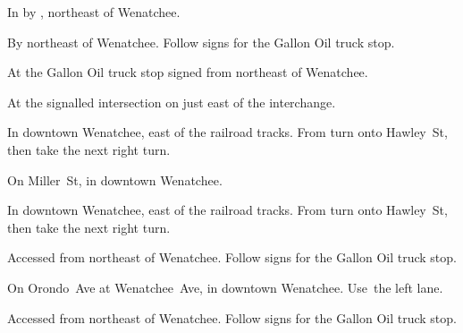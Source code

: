 
\begin{LocationList}

In  by  , northeast of Wenatchee.

By   northeast of Wenatchee.
Follow signs for the Gallon Oil truck stop.

At the Gallon Oil truck stop signed from   northeast of Wenatchee.

\Location{\GarageHQ \Garage}
At the signalled intersection on   just east of the  interchange.

In downtown Wenatchee, east of the railroad tracks.
From  turn onto Hawley~St, then take the next right turn.

\Location{\RecruitmentAgency \Recruitment}
On Miller~St, in downtown Wenatchee.

In downtown Wenatchee, east of the railroad tracks.
From  turn onto Hawley~St, then take the next right turn.

Accessed from   northeast of Wenatchee.
Follow signs for the Gallon Oil truck stop.

On Orondo~Ave at Wenatchee~Ave, in downtown Wenatchee.
Use~the left lane.

Accessed from   northeast of Wenatchee.
Follow signs for the Gallon Oil truck stop.

\end{LocationList}
